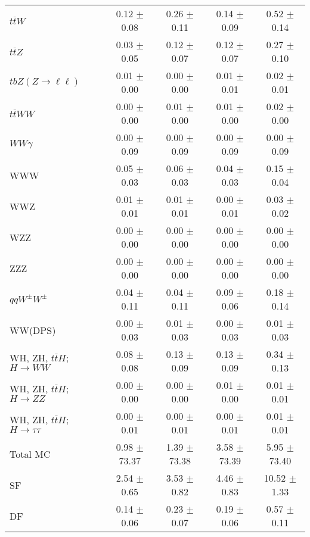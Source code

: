 \begin{tabular}{l|cccc}
                   $t\overline{t}W$ &  0.12 $\pm$  0.08 &  0.26 $\pm$  0.11 &  0.14 $\pm$  0.09 &  0.52 $\pm$  0.14 \\
                   $t\overline{t}Z$ &  0.03 $\pm$  0.05 &  0.12 $\pm$  0.07 &  0.12 $\pm$  0.07 &  0.27 $\pm$  0.10 \\
    $tbZ (Z \rightarrow \ell \ell)$ &  0.01 $\pm$  0.00 &  0.00 $\pm$  0.00 &  0.01 $\pm$  0.01 &  0.02 $\pm$  0.01 \\
                  $t\overline{t}WW$ &  0.00 $\pm$  0.00 &  0.01 $\pm$  0.00 &  0.01 $\pm$  0.00 &  0.02 $\pm$  0.00 \\
                         $WW\gamma$ &  0.00 $\pm$  0.09 &  0.00 $\pm$  0.09 &  0.00 $\pm$  0.09 &  0.00 $\pm$  0.09 \\
                                WWW &  0.05 $\pm$  0.03 &  0.06 $\pm$  0.03 &  0.04 $\pm$  0.03 &  0.15 $\pm$  0.04 \\
                                WWZ &  0.01 $\pm$  0.01 &  0.01 $\pm$  0.01 &  0.00 $\pm$  0.01 &  0.03 $\pm$  0.02 \\
                                WZZ &  0.00 $\pm$  0.00 &  0.00 $\pm$  0.00 &  0.00 $\pm$  0.00 &  0.00 $\pm$  0.00 \\
                                ZZZ &  0.00 $\pm$  0.00 &  0.00 $\pm$  0.00 &  0.00 $\pm$  0.00 &  0.00 $\pm$  0.00 \\
                 $qqW^{\pm}W^{\pm}$ &  0.04 $\pm$  0.11 &  0.04 $\pm$  0.11 &  0.09 $\pm$  0.06 &  0.18 $\pm$  0.14 \\
                            WW(DPS) &  0.00 $\pm$  0.03 &  0.01 $\pm$  0.03 &  0.00 $\pm$  0.03 &  0.01 $\pm$  0.03 \\
WH, ZH, $t\bar{t}H$; $H \rightarrow WW$ &  0.08 $\pm$  0.08 &  0.13 $\pm$  0.09 &  0.13 $\pm$  0.09 &  0.34 $\pm$  0.13 \\
WH, ZH, $t\bar{t}H$; $H \rightarrow ZZ$ &  0.00 $\pm$  0.00 &  0.00 $\pm$  0.00 &  0.01 $\pm$  0.00 &  0.01 $\pm$  0.01 \\
WH, ZH, $t\bar{t}H$; $H \rightarrow \tau\tau$ &  0.00 $\pm$  0.01 &  0.00 $\pm$  0.01 &  0.00 $\pm$  0.01 &  0.01 $\pm$  0.01 \\
\hline\hline
                           Total MC &  0.98 $\pm$ 73.37 &  1.39 $\pm$ 73.38 &  3.58 $\pm$ 73.39 &  5.95 $\pm$ 73.40 \\
\hline
                                 SF &  2.54 $\pm$  0.65 &  3.53 $\pm$  0.82 &  4.46 $\pm$  0.83 & 10.52 $\pm$  1.33 \\
                                 DF &  0.14 $\pm$  0.06 &  0.23 $\pm$  0.07 &  0.19 $\pm$  0.06 &  0.57 $\pm$  0.11 \\

\end{tabular}
